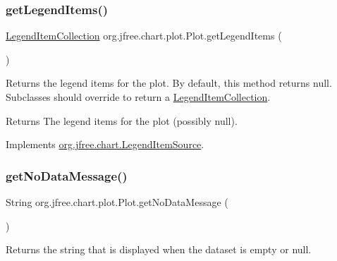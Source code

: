 \subsubsection{\texorpdfstring{get\+Legend\+Items()}{getLegendItems()}}
{\footnotesize\ttfamily \mbox{\hyperlink{classorg_1_1jfree_1_1chart_1_1_legend_item_collection}{Legend\+Item\+Collection}} org.\+jfree.\+chart.\+plot.\+Plot.\+get\+Legend\+Items (\begin{DoxyParamCaption}{ }\end{DoxyParamCaption})}

Returns the legend items for the plot. By default, this method returns {\ttfamily null}. Subclasses should override to return a \mbox{\hyperlink{classorg_1_1jfree_1_1chart_1_1_legend_item_collection}{Legend\+Item\+Collection}}.

\begin{DoxyReturn}{Returns}
The legend items for the plot (possibly {\ttfamily null}). 
\end{DoxyReturn}


Implements \mbox{\hyperlink{interfaceorg_1_1jfree_1_1chart_1_1_legend_item_source_a224409463c4f7a8ef0e2a9df337e6d3b}{org.\+jfree.\+chart.\+Legend\+Item\+Source}}.

\mbox{\label{classorg_1_1jfree_1_1chart_1_1plot_1_1_plot_a6a121d914481157af8e29f372ff130eb}} 
\subsubsection{\texorpdfstring{get\+No\+Data\+Message()}{getNoDataMessage()}}
{\footnotesize\ttfamily String org.\+jfree.\+chart.\+plot.\+Plot.\+get\+No\+Data\+Message (\begin{DoxyParamCaption}{ }\end{DoxyParamCaption})}

Returns the string that is displayed when the dataset is empty or {\ttfamily null}.

